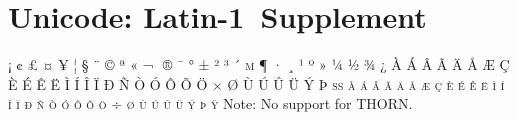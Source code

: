 

\presection\section*{\checkmeh Unicode: Latin-1~Supplement}\postsection

\textsc{¡ ¢ £ ¤ ¥ ¦ § ¨ © ª « ¬ ­ ® ¯ ° ± ² ³ ´ µ ¶ · ¸ ¹ º » ¼ ½ ¾ 
¿ À Á Â Ã Ä Å Æ Ç È É Ê Ë Ì Í Î Ï Ð Ñ Ò Ó Ô Õ Ö × Ø Ù Ú Û Ü Ý Þ ß 
à á â ã ä å æ ç è é ê ë ì í î ï ð ñ ò ó ô õ ö ÷ ø ù ú û ü ý þ ÿ
}
\hfill Note: No support for THORN.
